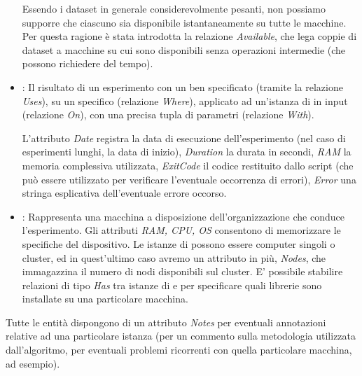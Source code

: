 \documentclass{article}
\begin{document}
\begin{itemize}
    Essendo i dataset in generale considerevolmente pesanti, non possiamo supporre che ciascuno sia disponibile istantaneamente su tutte le macchine. Per questa ragione è stata introdotta la relazione \emph{Available}, che lega coppie di dataset a macchine su cui sono disponibili senza operazioni intermedie (che possono richiedere del tempo).
    \item {}: Il risultato di un esperimento con un ben specificato  (tramite la relazione \emph{Uses}), su un  specifico (relazione \emph{Where}), applicato ad un'istanza di  in input (relazione \emph{On}), con una precisa tupla di parametri (relazione \emph{With}).

    L'attributo \emph{Date} registra la data di esecuzione dell'esperimento (nel caso di esperimenti lunghi, la data di inizio), \emph{Duration} la durata in secondi, \emph{RAM} la memoria complessiva utilizzata, \emph{ExitCode} il codice restituito dallo script (che può essere utilizzato per verificare l'eventuale occorrenza di errori), \emph{Error} una stringa esplicativa dell'eventuale errore occorso.
    \item {}: Rappresenta una macchina a disposizione dell'organizzazione che conduce l'esperimento. Gli attributi \emph{RAM, CPU, OS} consentono di memorizzare le specifiche del dispositivo. Le istanze di  possono essere computer singoli o cluster, ed in quest'ultimo caso avremo un attributo in più, \emph{Nodes}, che immagazzina il numero di nodi disponibili sul cluster. E' possibile stabilire relazioni di tipo \emph{Has} tra istanze di  e  per specificare quali librerie sono installate su una particolare macchina.
\end{itemize}
Tutte le entità dispongono di un attributo \emph{Notes} per eventuali annotazioni relative ad una particolare istanza (per  un commento sulla metodologia utilizzata dall'algoritmo, per  eventuali problemi ricorrenti con quella particolare macchina, ad esempio).
\end{document}
